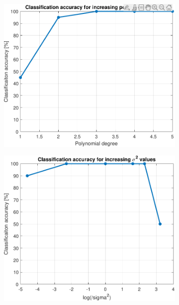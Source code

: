 \documentclass{article}
\begin{document}
            \begin{figure}[h]
             \centering
             \hspace{0.05\textwidth}
             \begin{subfigure}[b]{0.4\textwidth}
                 \centering
                 \includegraphics[width=\textwidth]{Assignment 1/figures/class_acc_poly_deg_val.pdf}
                 \label{fig:polynomial_degree}
             \end{subfigure}
             \hfill
             \begin{subfigure}[b]{0.4\textwidth}
                 \centering
                 \includegraphics[width=\textwidth]{Assignment 1/figures/class_acc_sigma2_val.pdf}

\end{subfigure}
\end{figure}
\end{document}
